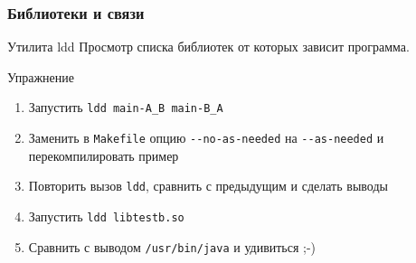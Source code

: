 
\begin{frame}
	\frametitle{Библиотеки и связи}

	\begin{block}{Утилита ldd}
		Просмотр списка библиотек от которых зависит программа.
	\end{block}

	\pause

	\begin{block}{Упражнение}
		\begin{enumerate}
			\item Запустить {\tt ldd main-A\_B main-B\_A}
			\item Заменить в {\tt Makefile} опцию {\tt -{}-no-as-needed} на {\tt -{}-as-needed}
				и перекомпилировать пример
			\item Повторить вызов {\tt ldd}, сравнить с предыдущим и сделать выводы
			\item Запустить {\tt ldd libtestb.so}
			\item Сравнить с выводом {\tt /usr/bin/java} и удивиться ;-)
		\end{enumerate}
	\end{block}

\end{frame}


